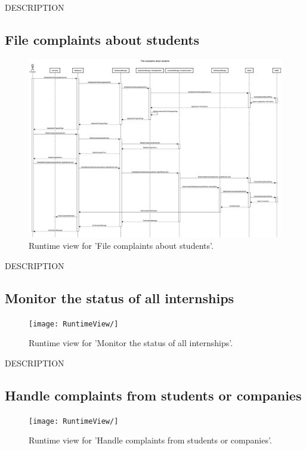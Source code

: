 DESCRIPTION


\subsection{File complaints about students}
\begin{figure}[H]
    \begin{center}
        \includegraphics[width=0.8\linewidth]{DD/LaTeX/Images/RuntimeView/FileComplaintsAboutStudents.png}
        \caption{Runtime view for 'File complaints about students'.}
        \label{fig:runtime_FileComplaintsAboutStudents}%
    \end{center}
\end{figure}

DESCRIPTION


\subsection{Monitor the status of all internships}
\begin{figure}[H]
    \begin{center}
        \texttt{[image: RuntimeView/]}
        \caption{Runtime view for 'Monitor the status of all internships'.}
        \label{fig:runtime_modifybadge}%
    \end{center}
\end{figure}

DESCRIPTION


\subsection{Handle complaints from students or companies}
\begin{figure}[H]
    \begin{center}
        \texttt{[image: RuntimeView/]}
        \caption{Runtime view for 'Handle complaints from students or companies'.}
        \label{fig:runtime_modifybadge}%
    \end{center}
\end{figure}

